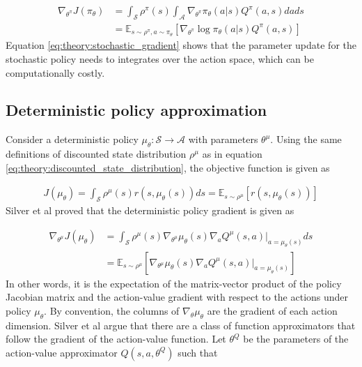 \documentclass[class=book, crop=false]{standalone}
\begin{document}
\begin{equation}
   \begin{aligned}\label{eq:theory:stochastic_gradient}
    \nabla_{\theta^{\pi}} J(\pi_{\theta}) &= 
     \int_{\mathcal{S}}\rho^{\pi}(s)
     \int_{\mathcal{A}} \nabla_{\theta^{\pi}} \pi_{\theta}(a|s)Q^{\pi}(a,s)da ds
     \\
     &= \mathbb{E}_{s\sim \rho^{\pi},a \sim \pi_{\theta}}
     [\nabla_{\theta^{\pi}} \log \pi_{\theta}(a|s)Q^{\pi}(a,s) ]
\end{aligned} 
\end{equation}
Equation \eqref{eq:theory:stochastic_gradient} shows that the parameter update for the stochastic policy needs to integrates over the action space, which can be computationally costly.

\subsection{Deterministic policy approximation}
Consider a deterministic policy $\mu_{\theta}: \mathcal{S} \to \mathcal{A}$ with parameters $\theta^{\mu}$. Using the same definitions of discounted state distribution $\rho^{\mu}$ as in equation
\eqref{eq:theory:discounted_state_distribution}, the objective function is given as 

\begin{equation}
   \begin{aligned}\label{eq:theory:objective_expected_deterministic}
    J(\mu_{\theta}) =
    \int_{\mathcal{S}}
    \rho^{\mu}(s)r(s,\mu_{\theta}(s)) ds = \mathbb{E}_{s\sim \rho^{\mu}}[r(s,\mu_{\theta}(s))]
\end{aligned} 
\end{equation}
Silver et al \cite{pmlr-v32-silver14} proved that the deterministic policy gradient is given as 

\begin{equation}
   \begin{aligned}\label{eq:theory:objective_gradient_deterministic}
    \nabla_{\theta^{\mu}}J(\mu_{\theta}) &=
    \int_{\mathcal{S}}
    \rho^{\mu}(s)
    \nabla_{\theta^{\mu}} \mu_{\theta}(s)
    \nabla_{a} Q^{\mu}(s,a)|_{a = \mu_{\theta}(s)}ds 
    \\
    &= \mathbb{E}_{s\sim \rho^{\mu}}
    [    \nabla_{\theta^{\mu}} \mu_{\theta}(s)
    \nabla_{a} Q^{\mu}(s,a)|_{a = \mu_{\theta}(s)}]
\end{aligned} 
\end{equation}
In other words, it is the expectation of the matrix-vector product of the policy Jacobian matrix and the action-value gradient with respect to the actions under policy $\mu_{\theta}$. By convention, the columns of $\nabla_{\theta} \mu_{\theta}$ are the gradient of each action dimension. Silver et al argue that there are a class of function approximators that follow the gradient of the action-value function. Let $\theta^{Q}$ be the parameters of the action-value approximator $Q(s,a,\theta^{Q})$ such that   
\end{document}
